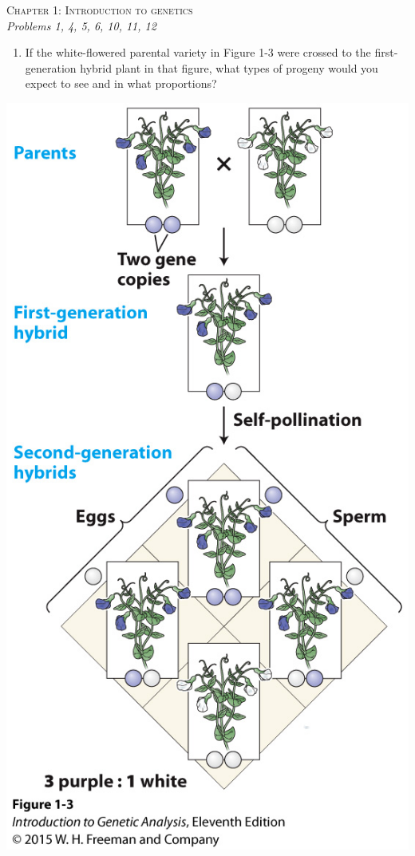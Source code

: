 \documentclass[11pt,]{article}
\providecommand{\tightlist}{%
  \setlength{\itemsep}{0pt}\setlength{\parskip}{0pt}}
\begin{document}
\begin{center}
\Large{\textsc{Chapter 1: Introduction to
genetics}}\\ \small{\textit{Problems 1, 4, 5, 6, 10, 11, 12}}\\
\vspace*{\baselineskip}
\end{center}

\begin{blackbox}

\begin{enumerate}
\def\labelenumi{\arabic{enumi}.}
\tightlist
\item
  If the white-flowered parental variety in Figure 1-3 were crossed to
  the first-generation hybrid plant in that figure, what types of
  progeny would you expect to see and in what proportions?
\end{enumerate}

\begin{center}\includegraphics[width=0.35\linewidth,]{input/figure_01_03} \end{center}

\vspace{9cm}

\end{blackbox}
\end{document}
